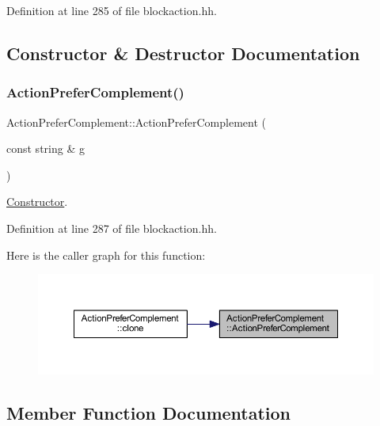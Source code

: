 Definition at line 285 of file blockaction.\+hh.



\subsection{Constructor \& Destructor Documentation}
\mbox{\label{class_action_prefer_complement_a39c88a8ebde13877b979fe09eaaf7472}} 
\subsubsection{\texorpdfstring{ActionPreferComplement()}{ActionPreferComplement()}}
{\footnotesize\ttfamily Action\+Prefer\+Complement\+::\+Action\+Prefer\+Complement (\begin{DoxyParamCaption}\item[{const string \&}]{g }\end{DoxyParamCaption})\hspace{0.3cm}{\ttfamily [inline]}}



\mbox{\hyperlink{class_constructor}{Constructor}}. 



Definition at line 287 of file blockaction.\+hh.

Here is the caller graph for this function\+:
\nopagebreak
\begin{figure}[H]
\begin{center}
\leavevmode
\includegraphics[width=350pt]{class_action_prefer_complement_a39c88a8ebde13877b979fe09eaaf7472_icgraph}
\end{center}
\end{figure}


\subsection{Member Function Documentation}
\mbox{\label{class_action_prefer_complement_a88227ed0c02b56ff86ffae3a02f8eff4}} 
